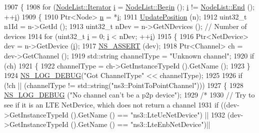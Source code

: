 \begin{DoxyCode}
1907 \{
1908   \textcolor{keywordflow}{for} (\hyperlink{classns3_1_1NodeList_a9e2679a94efb4f0066cc21e65440364d}{NodeList::Iterator} \hyperlink{bernuolliDistribution_8m_a6f6ccfcf58b31cb6412107d9d5281426}{i} = \hyperlink{classns3_1_1NodeList_a93d2211831f5cb71d1dbb721e2721d7f}{NodeList::Begin} (); 
      \hyperlink{bernuolliDistribution_8m_a6f6ccfcf58b31cb6412107d9d5281426}{i} != \hyperlink{classns3_1_1NodeList_a027a558c16e6078e25c7ffc67becb559}{NodeList::End} (); ++\hyperlink{bernuolliDistribution_8m_a6f6ccfcf58b31cb6412107d9d5281426}{i})
1909     \{
1910       Ptr<Node> \hyperlink{namespacesample-rng-plot_aeb5ee5c431e338ef39b7ac5431242e1d}{n} = *\hyperlink{bernuolliDistribution_8m_a6f6ccfcf58b31cb6412107d9d5281426}{i};
1911       \hyperlink{classns3_1_1AnimationInterface_ab751cf6f459289f0978f4bb97b93044d}{UpdatePosition} (n);
1912       uint32\_t n1Id = n->GetId ();
1913       uint32\_t nDev = n->GetNDevices ();  \textcolor{comment}{// Number of devices}
1914       \textcolor{keywordflow}{for} (uint32\_t \hyperlink{bernuolliDistribution_8m_a6f6ccfcf58b31cb6412107d9d5281426}{i} = 0; \hyperlink{bernuolliDistribution_8m_a6f6ccfcf58b31cb6412107d9d5281426}{i} < nDev; ++\hyperlink{bernuolliDistribution_8m_a6f6ccfcf58b31cb6412107d9d5281426}{i})
1915         \{
1916           Ptr<NetDevice> dev = n->GetDevice (\hyperlink{bernuolliDistribution_8m_a6f6ccfcf58b31cb6412107d9d5281426}{i});
1917           \hyperlink{assert_8h_a6dccdb0de9b252f60088ce281c49d052}{NS\_ASSERT} (dev);
1918           Ptr<Channel>   ch = dev->GetChannel ();
1919           std::string channelType = \textcolor{stringliteral}{"Unknown channel"};
1920           \textcolor{keywordflow}{if} (ch)
1921             \{
1922               channelType = ch->GetInstanceTypeId ().GetName ();
1923             \}
1924           \hyperlink{group__logging_ga413f1886406d49f59a6a0a89b77b4d0a}{NS\_LOG\_DEBUG}(\textcolor{stringliteral}{"Got ChannelType"} << channelType);
1925 
1926           \textcolor{keywordflow}{if} (!ch || (channelType != std::string(\textcolor{stringliteral}{"ns3::PointToPointChannel"})))
1927             \{
1928               \hyperlink{group__logging_ga413f1886406d49f59a6a0a89b77b4d0a}{NS\_LOG\_DEBUG} (\textcolor{stringliteral}{"No channel can't be a p2p device"});
1929               \textcolor{comment}{/*}
1930 \textcolor{comment}{              // Try to see if it is an LTE NetDevice, which does not return a channel
}
1931 \textcolor{comment}{              if ((dev->GetInstanceTypeId ().GetName () == "ns3::LteUeNetDevice") || 
}
1932 \textcolor{comment}{                  (dev->GetInstanceTypeId ().GetName () == "ns3::LteEnbNetDevice")||
}
\end{DoxyCode}
